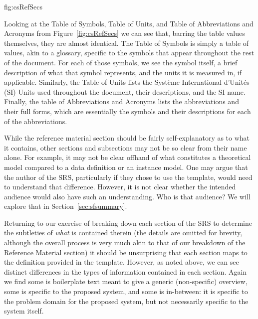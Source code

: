 {fig:csRefSecs}

Looking at the Table of Symbols, Table of Units, and Table of Abbreviations and 
Acronyms from Figure~\ref{fig:csRefSecs} we can see that, barring the table 
values themselves, they are almost identical. The Table of Symbols is simply a 
table of values, akin to a glossary, specific to the symbols that 
appear throughout the rest of the document. For each of those symbols, we see 
the symbol itself, a brief description of what that symbol represents, and the 
units it is measured in, if applicable. Similarly, the Table of Units lists the
Syst\`eme International d'Unit\'es (SI) Units used throughout the document, 
their descriptions, and the SI name. Finally, the table of Abbreviations and 
Acronyms lists the abbreviations and their full forms, which are 
essentially the symbols and their descriptions for each of the abbreviations.

While the reference material section should be fairly self-explanatory as to 
what it contains, other sections and subsections may not be so clear from their 
name alone. For example, it may not be clear offhand of what constitutes a 
theoretical model compared to a data definition or an instance model. One may 
argue that the author of the SRS, particularly if they chose to use the 
\smithea{} template, would need to understand that difference. However, it is 
not clear whether the intended audience would also have such an understanding. 
Who is that audience? We will explore that in Section~\ref{sec:sfsummary}.

Returning to our exercise of breaking down each section of the SRS to determine 
the subtleties of \emph{what} is contained therein (the details are omitted for 
brevity, although the overall process is very much akin to that of our 
breakdown of the Reference Material section) it should be unsurprising that 
each section maps to the definition provided in the \smithea{} template. 
However, as noted above, we can see distinct differences in the types of 
information contained in each section. Again we find some is boilerplate text 
meant to give a generic  (non-specific) overview, some is specific to the 
proposed system, and some is in-between: it is specific to the 
problem domain for the proposed system, but not necessarily specific to the 
system itself.

